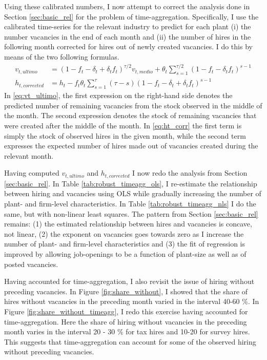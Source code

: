 Using these calibrated numbers, I now attempt to correct the analysis done in Section \ref{sec:basic_rel} for the problem of time-aggregation. Specifically, I use the calibrated time-series for the relevant industry to predict for each plant (i) the number vacancies in the end of each month and (ii) the number of hires in the following month corrected for hires out of newly created vacancies. I do this by means of the two following formulas. 
\begin{align}
v_{t,ultimo}&=\left( 1-f_t-\delta_t+\delta_t f_t \right)^{\tau/2} v_{t,medio} + \theta_t \sum_{s=1}^{\tau/2} \left( 1-f_t-\delta_t f_t \right)^{s-1} \label{eq:vt_ultimo} \\
h_{t,corrected}&=h_t-f_t \theta_t \sum_{s=1}^{\tau} \left( \tau- s\right) \left( 1-f_t-\delta_t+\delta_t f_t \right)^{s-1} \label{eq:ht_corr}
\end{align}
In \eqref{eq:vt_ultimo}, the first expression on the right-hand side denotes the predicted number of remaining vacancies from the stock observed in the middle of the month. The second expression denotes the stock of remaining vacancies that were created after the middle of the month. In \eqref{eq:ht_corr} the first term is simply the stock of observed hires in the given month, while the second term expresses the expected number of hires made out of vacancies created during the relevant month.

Having computed $v_{t,ultimo}$ and $h_{t,corrected}$ I now redo the analysis from Section \ref{sec:basic_rel}. In Table \ref{tab:robust_timeagg_ols}, I re-estimate the relationship between hiring and vacancies using OLS while gradually increasing the number of plant- and firm-level characteristics. In Table \ref{tab:robust_timeagg_nls} I do the same, but with non-linear least squares. The pattern from Section \ref{sec:basic_rel} remains: (1) the estimated relationship between hires and vacancies is concave, not linear, (2) the exponent on vacancies goes towards zero as I increase the number of plant- and firm-level characteristics and (3) the fit of regression is improved by allowing job-openings to be a function of plant-size as well as of posted vacancies. 

Having accounted for time-aggregation, I also revisit the issue of hiring without preceding vacancies. In Figure \ref{fig:share_without}, I showed that the share of hires without vacancies in the preceding month varied in the interval 40-60 \%. In Figure \ref{fig:share_without_timeagg}, I redo this exercise having accounted for time-aggregation. Here the share of hiring without vacancies in the preceding month varies in the interval 20 - 30 \% for tax hires and 10-20 for survey hires. This suggests that time-aggregation can account for some of the observed hiring without preceding vacancies.

